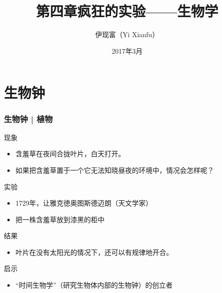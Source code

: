 



\title[生物学]{第四章\quad 疯狂的实验——生物学}
\author[Yixf]{伊现富（Yi Xianfu）}
\date{2017年3月}



\section{生物钟}
\begin{frame}
  \frametitle{生物钟 | 植物}
  \begin{block}{现象}
    \begin{itemize}
      \item 含羞草在夜间合拢叶片，白天打开。
      \item 如果把含羞草置于一个它无法知晓昼夜的环境中，情况会怎样呢？
    \end{itemize}
  \end{block}
  \pause
  \begin{block}{实验}
    \begin{itemize}
      \item 1729年，让\textbullet 雅克\textbullet 徳奥图斯\textbullet 德迈朗（天文学家）
      \item 把一株含羞草放到漆黑的柜中
    \end{itemize}
  \end{block}
  \pause
  \begin{block}{结果}
    \begin{itemize}
      \item 叶片在没有太阳光的情况下，还可以有规律地开合。
    \end{itemize}
  \end{block}
  \pause
  \begin{block}{启示}
    \begin{itemize}
      \item “时间生物学”（研究生物体内部的生物钟）的创立者
    \end{itemize}
  \end{block}
\end{frame}


